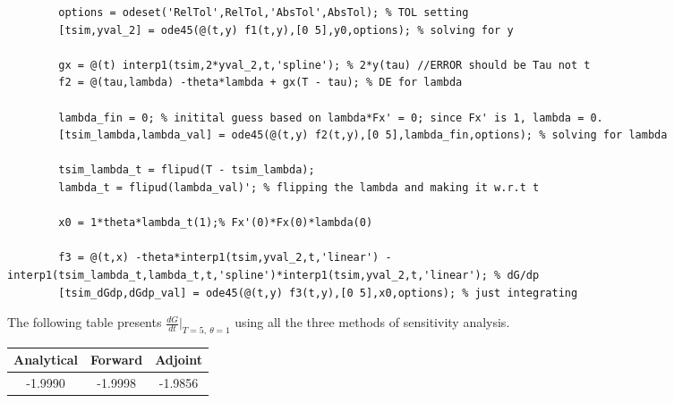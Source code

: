 \begin{enumerate}
\begin{lstlisting}
		options = odeset('RelTol',RelTol,'AbsTol',AbsTol); % TOL setting
		[tsim,yval_2] = ode45(@(t,y) f1(t,y),[0 5],y0,options); % solving for y
		
		gx = @(t) interp1(tsim,2*yval_2,t,'spline'); % 2*y(tau) //ERROR should be Tau not t
		f2 = @(tau,lambda) -theta*lambda + gx(T - tau); % DE for lambda
		
		lambda_fin = 0; % initital guess based on lambda*Fx' = 0; since Fx' is 1, lambda = 0.
		[tsim_lambda,lambda_val] = ode45(@(t,y) f2(t,y),[0 5],lambda_fin,options); % solving for lambda
		
		tsim_lambda_t = flipud(T - tsim_lambda);
		lambda_t = flipud(lambda_val)'; % flipping the lambda and making it w.r.t t

		x0 = 1*theta*lambda_t(1);% Fx'(0)*Fx(0)*lambda(0)
		
		f3 = @(t,x) -theta*interp1(tsim,yval_2,t,'linear') - interp1(tsim_lambda_t,lambda_t,t,'spline')*interp1(tsim,yval_2,t,'linear'); % dG/dp
		[tsim_dGdp,dGdp_val] = ode45(@(t,y) f3(t,y),[0 5],x0,options); % just integrating
	\end{lstlisting}
\end{enumerate}
The following table presents $\frac{dG}{dt}|_{T = 5,\ \theta = 1}$ using all the three methods of sensitivity analysis.
\begin{center}
	\begin{tabular}{c|c|c}
		Analytical & Forward & Adjoint \\
		\hline
		-1.9990 & -1.9998 & -1.9856
	\end{tabular}
\end{center}
